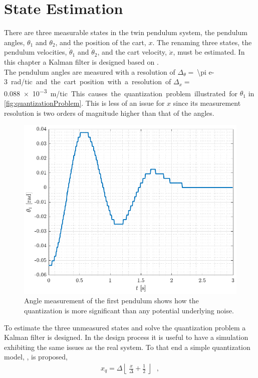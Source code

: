 %
\chapter{State Estimation}
There are three measurable states in the twin pendulum system, the pendulum angles, $\theta_1$ and $\theta_2$, and the position of the cart, $x$. The renaming three states, the pendulum velocities, $\dot{\theta}_1$ and $\dot{\theta}_2$, and the cart velocity, $\dot{x}$, must be estimated. In this chapter a Kalman filter is designed based on \cite{haugen2015kompendium, rhudy2017kalman}.\\
The pendulum angles are measured with a resolution of $\Delta_\theta =\ $\SI{\pi e-3} rad/tic and the cart position with a resolution of $\Delta_x =\ $\SI{0.088e-3} m/tic. This causes the quantization problem illustrated for $\theta_1$ in \autoref{fig:quantizationProblem}. This is less of an issue for $x$ since its measurement resolution is two orders of magnitude higher than that of the angles.
%
\begin{figure}[H]
  \includegraphics[width=.7\textwidth]{figures/quantizationProblem}
  \caption{Angle measurement of the first pendulum shows how the quantization is more significant than any potential underlying noise.}
  \label{fig:quantizationProblem}
\end{figure}
%
To estimate the three unmeasured states and solve the quantization problem a Kalman filter is designed. In the design process it is useful to have a simulation exhibiting the same issues as the real system. To that end a simple quantization model, \cite[35]{dutoit2010applied}, is proposed,
\begin{align}
x_q = \Delta \left\lfloor\ \frac{x}{\Delta} + \frac{1}{2}\ \right\rfloor \ \ \ ,   \label{eq:quantizationModel}
\end{align}
